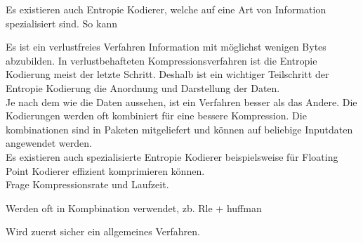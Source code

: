 Es existieren auch Entropie Kodierer, welche auf eine Art von Information spezialisiert sind. So kann


 Es ist ein verlustfreies Verfahren Information mit möglichst wenigen Bytes abzubilden. In verlustbehafteten Kompressionsverfahren ist die Entropie Kodierung meist der letzte Schritt. Deshalb ist ein wichtiger Teilschritt der Entropie Kodierung die Anordnung und Darstellung der Daten.\\
Je nach dem wie die Daten aussehen, ist ein Verfahren besser als das Andere.  Die Kodierungen werden oft kombiniert für eine bessere Kompression. Die kombinationen sind in Paketen mitgeliefert und können auf beliebige Inputdaten angewendet werden.\\

Es existieren auch spezialisierte Entropie Kodierer beispielsweise für Floating Point Kodierer \cite{ratanaworabhan2006fast} effizient komprimieren können.\\
Frage Kompressionsrate und Laufzeit.

Werden oft in Kompbination verwendet, zb. Rle + huffman

Wird zuerst sicher ein allgemeines Verfahren.